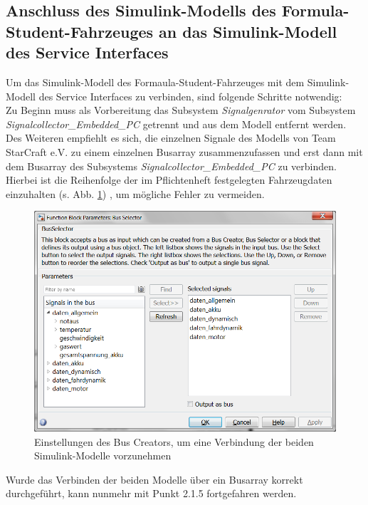 \documentclass[fontsize = 12pt, paper = a4]{scrreprt}
\begin{document}
\subsection{Anschluss des Simulink-Modells des Formula-Student-Fahrzeuges an das Simulink-Modell des Service Interfaces}

Um das Simulink-Modell des Formaula-Student-Fahrzeuges mit dem Simulink-Modell des Service Interfaces zu verbinden, sind folgende Schritte notwendig: \\

Zu Beginn muss als Vorbereitung das Subsystem \textit{Signalgenrator} vom Subsystem \textit{Signalcollector\_Embedded\_PC} getrennt und aus dem Modell entfernt werden. Des Weiteren empfiehlt es sich, die einzelnen Signale des Modells von Team StarCraft e.V. zu einem einzelnen Busarray zusammenzufassen und erst dann mit dem Busarray des Subsystems \textit{Signalcollector\_Embedded\_PC} zu verbinden.
Hierbei ist die Reihenfolge der im Pflichtenheft festgelegten Fahrzeugdaten einzuhalten (s. Abb. \ref{anschlussbus}) , um mögliche Fehler zu vermeiden. 

\begin{figure}[h]
\centering
\includegraphics[scale = 0.45]{anschlussbus}
\caption[Einstellungen des Bus Creators]{Einstellungen des Bus Creators, um eine Verbindung der beiden Simulink-Modelle vorzunehmen}
\label{anschlussbus}
\end{figure} 

Wurde das Verbinden der beiden Modelle über ein Busarray korrekt durchgeführt, kann nunmehr mit Punkt 2.1.5 fortgefahren werden.


\end{document}
